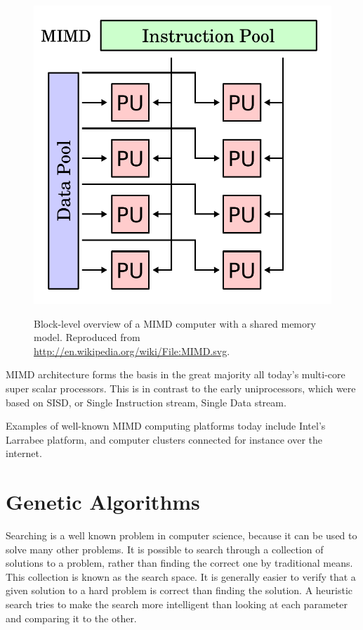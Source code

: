 \begin{figure}[H]
\begin{center}
    \includegraphics[width=\textwidth/2]{fig/mimd-block-diagram.pdf}
    \label{figure:mimd-block-diagram}
    \caption[
    Block-level overview of a MIMD computer with a shared memory model
    ]{Block-level overview of a MIMD computer with a shared memory model. Reproduced from \url{http://en.wikipedia.org/wiki/File:MIMD.svg}.}
\end{center}
\end{figure}


MIMD architecture forms the basis in the great majority all today’s multi-core super scalar processors.
This is in contrast to the early uniprocessors, which were based on SISD, or Single Instruction stream, Single Data stream. 


Examples of well-known MIMD computing platforms today include Intel's Larrabee platform, and computer clusters connected for instance over the internet.

\section{Genetic Algorithms}
\label{ga-algorithms}

Searching is a well known problem in computer science, because it can be used to solve many other problems.
It is possible to search through a collection of solutions to a problem, rather than finding the correct one by traditional means.
This collection is known as the \Gls{search space}.
It is generally easier to verify that a given solution to a hard problem is correct than finding the solution.
A heuristic search tries to make the search more intelligent than looking at each parameter and comparing it to the other.

